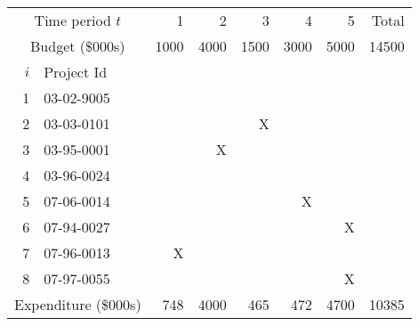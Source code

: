 \begin{tabular}{rlrrrrrr}
\hline
\multicolumn{2}{c}{Time period $t$} & 1 & 2 & 3 & 4 & 5 & Total  \\
\multicolumn{2}{c}{Budget (\$000s)}  & 1000 & 4000 & 1500 & 3000 & 5000 & 14500\\
$i$ & Project Id  \\
\hline
1 & 03-02-9005 &      &         &         &         &      \\
2 & 03-03-0101 &      &         &    X    &         &      \\
3 & 03-95-0001 &      &    X    &         &         &      \\
4 & 03-96-0024 &      &         &         &         &      \\
5 & 07-06-0014 &      &         &         &    X    &      \\
6 & 07-94-0027 &      &         &         &         &    X \\
7 & 07-96-0013 & X    &         &         &         &      \\
8 & 07-97-0055 &      &         &         &         &    X \\
\hline
\multicolumn{2}{c}{Expenditure (\$000s) } & 748 & 4000 & 465 & 472 & 4700 & 10385 \\
\hline
\end{tabular}
